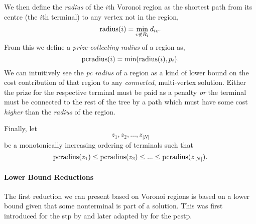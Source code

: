 We then define the \textit{radius} of the $i$th Voronoi region as the shortest path
from its centre (the $i$th terminal)
to any vertex not in the region,
$$\operatorname{radius}(i) = \min_{v \not\in R_i} d_{iv}\mathnormal{.}$$
From this we define a \textit{prize-collecting radius} of a region as,
$$\operatorname{pcradius}(i) = \min(\operatorname{radius}(i), p_i)\mathnormal{.}$$
We can intuitively see the \textit{pc radius} of a region as a kind of lower bound
on the cost contribution
 of that region to any
 \textit{connected}, multi-vertex solution. Either the prize for the respective terminal must be paid as a penalty
 \textit{or} the terminal must be connected to the rest of the tree by a path which must have some cost \textit{higher}
 than the \textit{radius} of the region.

 Finally, let
 $$z_1, z_2, \ldots, z_{|N|}$$
 be a monotonically increasing ordering of terminals such that
$$\operatorname{pcradius}(z_1) \leq \operatorname{pcradius}(z_2) \leq ... \leq \operatorname{pcradius}(z_{|N|})\mathnormal{.}$$

\paragraph{Lower Bound Reductions}

The first reduction we can present based on Voronoi regions is based on a lower bound given that some nonterminal is
part of a solution. This was first introduced for the \gls{stp} by \citet{polzin2001improved} and later adapted by
\citet{rehfeldt2016reduction} for the \gls{pcstp}.

